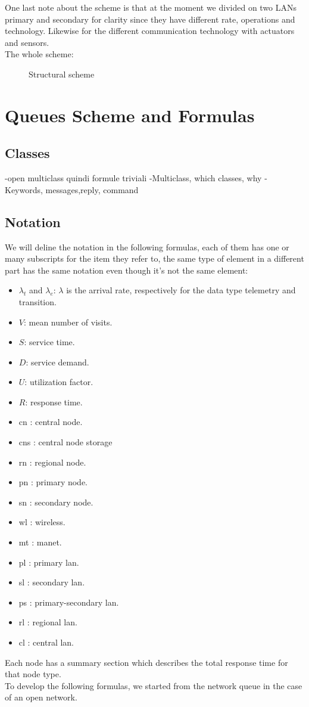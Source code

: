 \documentclass[11pt]{article}
\begin{document}
One last note about the scheme is that at the moment we divided on two LANs primary and secondary for clarity since they have different rate, operations and technology. Likewise for the different communication technology with actuators and sensors.\\
The whole scheme:
\begin{figure}[H]
	\hspace*{-3.75cm}
	\frame{}
  \caption{Structural scheme}
\end{figure}

\section{Queues Scheme and Formulas}
\subsection{Classes}
-open multiclass quindi formule triviali
-Multiclass, which classes, why
-Keywords, messages,reply, command
\subsection{Notation}
We will deline the notation in the following formulas, each of them has one or many subscripts for the item they refer to, the same type of element in a different part has the same notation even though it's not the same element:
\begin{itemize}
\item $\lambda_t$ and $\lambda_e$: $\lambda$ is the arrival rate, respectively for the data type telemetry and transition.
\item $V$: mean number of visits.
\item $S$: service time.
\item $D$: service demand.
\item $U$: utilization factor.
\item $R$: response time.
\end{itemize}

\begin{itemize}
\item cn : central node.
\item cns : central node storage
\item rn : regional node.
\item pn : primary node.
\item sn : secondary node.
\item wl : wireless.
\item mt : manet.
\item pl : primary lan.
\item sl : secondary lan.
\item ps : primary-secondary lan.
\item rl : regional lan.
\item cl : central lan.
\end{itemize}
Each node has a summary section which describes the total response time for that node type.\\
To develop the following formulas, we started from the network queue in the case of an open network.
\end{document}
